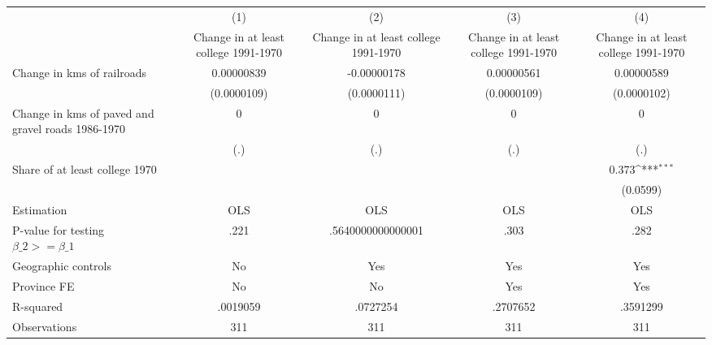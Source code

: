 {
\def\sym#1{\ifmmode^{#1}\else\(^{#1}\)\fi}
\begin{tabular}{l*{4}{c}}
\hline\hline
                &\multicolumn{1}{c}{(1)}&\multicolumn{1}{c}{(2)}&\multicolumn{1}{c}{(3)}&\multicolumn{1}{c}{(4)}\\
                &\multicolumn{1}{c}{Change in at least college 1991-1970}&\multicolumn{1}{c}{Change in at least college 1991-1970}&\multicolumn{1}{c}{Change in at least college 1991-1970}&\multicolumn{1}{c}{Change in at least college 1991-1970}\\
\hline
Change in kms of railroads&0.00000839         &-0.00000178         &0.00000561         &0.00000589         \\
                &(0.0000109)         &(0.0000111)         &(0.0000109)         &(0.0000102)         \\
[1em]
Change in kms of paved and gravel roads 1986-1970&        0         &        0         &        0         &        0         \\
                &      (.)         &      (.)         &      (.)         &      (.)         \\
[1em]
Share of at least college 1970&                  &                  &                  &    0.373\sym{***}\\
                &                  &                  &                  & (0.0599)         \\
\hline
Estimation      &      OLS         &      OLS         &      OLS         &      OLS         \\
P-value for testing $\beta\_2 >= \beta\_1$&     .221         &.5640000000000001         &     .303         &     .282         \\
Geographic controls&       No         &      Yes         &      Yes         &      Yes         \\
Province FE     &       No         &       No         &      Yes         &      Yes         \\
R-squared       & .0019059         & .0727254         & .2707652         & .3591299         \\
Observations    &      311         &      311         &      311         &      311         \\
\hline\hline
\end{tabular}
}
